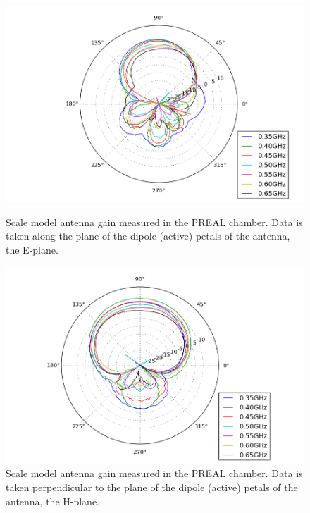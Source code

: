 \begin{figure}[htb]
\centering
\begin{minipage}[b]{0.46\textwidth}
\centering
\includegraphics[width=0.95\linewidth]{SCIHI_system/figures/HIbiscus_Gain_model_H_polar.png}
\caption{Scale model antenna gain measured in the PREAL chamber. Data is taken along the plane of the dipole (active) petals of the antenna, the E-plane. }
\label{Fig:eplane_gain_sm}
\end{minipage}%
\begin{minipage}[b]{0.02\textwidth}
\hspace{1cm}
\end{minipage}%
\begin{minipage}[b]{0.46\textwidth}
\centering
\includegraphics[width=0.95\linewidth]{SCIHI_system/figures/HIbiscus_Gain_model_V_polar.png}
\caption{Scale model antenna gain measured in the PREAL chamber. Data is taken perpendicular to the plane of the dipole (active) petals of the antenna, the H-plane. }
\label{Fig:hplane_gain_sm}
\end{minipage}
\end{figure}



